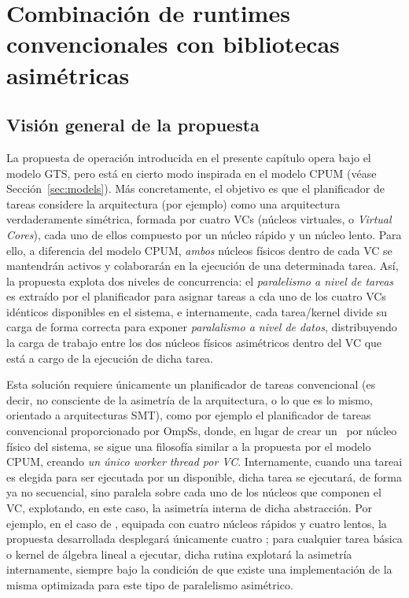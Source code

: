 \section{Combinación de runtimes convencionales con bibliotecas asimétricas}

\subsection{Visión general de la propuesta}

La propuesta de operación introducida en el presente capítulo opera bajo el modelo GTS, pero está en cierto modo 
inspirada en el modelo CPUM (véase Sección~\ref{sec:models}). Más concretamente, el objetivo es que el planificador
de tareas considere la arquitectura \odroid (por ejemplo) como una arquitectura verdaderamente simétrica, formada por 
cuatro VCs (núcleos virtuales, o {\em Virtual Cores}), cada uno de ellos compuesto por un núcleo rápido y un núcleo
lento. Para ello, a diferencia del modelo CPUM, {\em ambos} núcleos físicos dentro de cada VC se mantendrán activos y 
colaborarán en la ejecución de una determinada tarea. Así, la propuesta explota dos niveles de concurrencia: el {\em paralelismo
a nivel de tareas} es extraído por el planificador para asignar tareas a cda uno de los cuatro VCs idénticos disponibles en
el sistema, e internamente, cada tarea/kernel divide su carga de forma correcta para exponer {\em paralalismo a nivel de datos}, 
distribuyendo la carga de trabajo entre los dos núcleos físicos asimétricos dentro del VC que está a cargo de la ejecución
de dicha tarea.

Esta solución requiere únicamente un planificador de tareas convencional (es decir, no consciente de la asimetría de la arquitectura, o lo
que es lo mismo, orientado a arquitecturas SMT), como por ejemplo el planificador de tareas convencional proporcionado por OmpSs, donde, 
en lugar de crear un \wt\ por núcleo físico del sistema, se sigue una filosofía similar a la propuesta por el modelo CPUM, creando 
{\em un único worker thread por VC}. Internamente, cuando una tareai es elegida para ser ejecutada por un \wt disponible, dicha tarea
se ejecutará, de forma ya no secuencial, sino paralela sobre cada uno de los núcleos que componen el VC, explotando, en este caso,
la asimetría interna de dicha abstracción. Por ejemplo, en el caso de \odroid, equipada con cuatro núcleos rápidos y cuatro lentos, 
la propuesta desarrollada desplegará únicamente cuatro \wt; para cualquier tarea básica o kernel de álgebra lineal a ejecutar, dicha
rutina explotará la asimetría internamente, siempre bajo la condición de que existe una implementación de la misma optimizada para
este tipo de paralelismo asimétrico.

